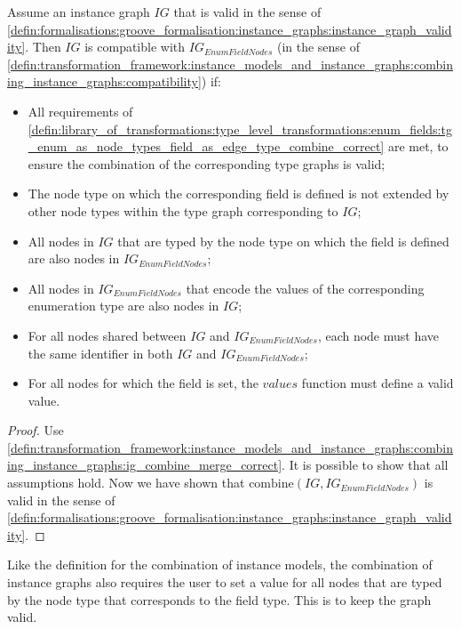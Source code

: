 \begin{thm}
\label{defin:library_of_transformations:instance_level_transformations:enum_field_values:ig_enum_as_node_types_field_as_edge_type_combine_correct}
Assume an instance graph $IG$ that is valid in the sense of \cref{defin:formalisations:groove_formalisation:instance_graphs:instance_graph_validity}. Then $IG$ is compatible with $IG_{EnumFieldNodes}$ (in the sense of \cref{defin:transformation_framework:instance_models_and_instance_graphs:combining_instance_graphs:compatibility}) if:
\begin{itemize}
    \item All requirements of \cref{defin:library_of_transformations:type_level_transformations:enum_fields:tg_enum_as_node_types_field_as_edge_type_combine_correct} are met, to ensure the combination of the corresponding type graphs is valid;
    \item The node type on which the corresponding field is defined is not extended by other node types within the type graph corresponding to $IG$;
    \item All nodes in $IG$ that are typed by the node type on which the field is defined are also nodes in $IG_{EnumFieldNodes}$;
    \item All nodes in $IG_{EnumFieldNodes}$ that encode the values of the corresponding enumeration type are also nodes in $IG$;
    \item For all nodes shared between $IG$ and $IG_{EnumFieldNodes}$, each node must have the same identifier in both $IG$ and $IG_{EnumFieldNodes}$;
    \item For all nodes for which the field is set, the $values$ function must define a valid value.
\end{itemize}
\end{thm}

\begin{proof}
Use \cref{defin:transformation_framework:instance_models_and_instance_graphs:combining_instance_graphs:ig_combine_merge_correct}. It is possible to show that all assumptions hold. Now we have shown that $\mathrm{combine}(IG, IG_{EnumFieldNodes})$ is valid in the sense of \cref{defin:formalisations:groove_formalisation:instance_graphs:instance_graph_validity}.
\end{proof}

Like the definition for the combination of instance models, the combination of instance graphs also requires the user to set a value for all nodes that are typed by the node type that corresponds to the field type. This is to keep the graph valid.

